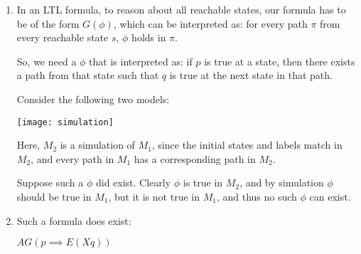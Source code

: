 


\begin{enumerate}[label=(\alph*)]

  \item
    In an LTL formula, to reason about all reachable states, our formula has to be of the form $G (\phi)$, which can be interpreted as: for every path $\pi$ from every reachable state $s$, $\phi$ holds in $\pi$.

    So, we need a $\phi$ that is interpreted as: if $p$ is true at a state, then there exists a path from that state such that $q$ is true at the next state in that path.

    Consider the following two models:

    \texttt{[image: simulation]}

    Here, $M_2$ is a simulation of $M_1$, since the initial states and labels match in $M_2$, and every path in $M_1$ has a corresponding path in $M_2$.

    Suppose such a $\phi$ did exist. Clearly $\phi$ is true in $M_2$, and by simulation $\phi$ should be true in $M_1$, but it is not true in $M_1$, and thus no such $\phi$ can exist.

    \item
      Such a formula does exist:

      $AG (p \implies E (X q))$
        
    \end{enumerate}

